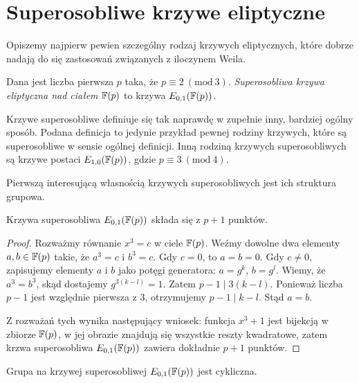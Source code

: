 \section{Superosobliwe krzywe eliptyczne}

\noindent
Opiszemy najpierw pewien szczególny rodzaj krzywych eliptycznych,
które dobrze nadają do się zastosowań związanych z iloczynem Weila.

\begin{definition}
Dana jest liczba pierwsza $p$ taka, że $p \equiv 2\ (\mathrm{mod}\ 3)$.
\emph{Superosobliwa krzywa eliptyczna nad ciałem $\mathbb{F}(p)$}
to krzywa $E_{0,1}(\mathbb{F}(p))$.
\end{definition}

\begin{remark}
Krzywe superosobliwe definiuje się tak naprawdę w zupełnie inny,
bardziej ogólny sposób. Podana definicja to jedynie przykład
pewnej rodziny krzywych, które są superosobliwe w sensie ogólnej definicji.
Inną rodziną krzywych superosobliwych są krzywe postaci $E_{1,0}(\mathbb{F}(p))$,
gdzie $p \equiv 3\ (\mathrm{mod}\ 4)$.
\end{remark}

\noindent
Pierwszą interesującą własnością krzywych superosobliwych
jest ich struktura grupowa.

\begin{theorem}
Krzywa superosobliwa $E_{0,1}(\mathbb{F}(p))$ składa się z $p + 1$ punktów.
\end{theorem}

\begin{proof}
Rozważmy równanie $x^3 = c$ w ciele $\mathbb{F}(p)$.
Weźmy dowolne dwa elementy $a, b \in \mathbb{F}(p)$ takie, że $a^3 = c$ i $b^3 = c$.
Gdy $c = 0$, to $a = b = 0$.
Gdy $c \neq 0$, zapisujemy elementy $a$ i $b$ jako potęgi generatora:
$a = g^k$, $b = g^l$.
Wiemy, że $a^3 = b^3$, skąd dostajemy $g^{3(k-l)} = 1$.
Zatem $p-1 \mid 3(k-l)$.
Ponieważ liczba $p-1$ jest względnie pierwsza z $3$,
otrzymujemy $p-1 \mid k-l$.
Stąd $a = b$.

\noindent
Z rozważań tych wynika następujący wniosek:
funkcja $x^3 + 1$ jest bijekcją w zbiorze $\mathbb{F}(p)$,
w jej obrazie znajdują się wszystkie reszty kwadratowe,
zatem krzwa superosobliwa $E_{0,1}(\mathbb{F}(p))$ zawiera dokładnie $p+1$ punktów.
\end{proof}

\begin{theorem}
Grupa na krzywej superosobliwej $E_{0,1}(\mathbb{F}(p))$
jest cykliczna.
\end{theorem}

